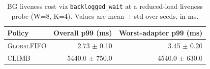 \begin{table}[t]
  \centering
  \small
  \setlength{\tabcolsep}{4pt}
  \caption{BG liveness cost via \texttt{backlogged\_wait} at a reduced-load liveness probe (W=8, K=4). Values are mean $\pm$ std over seeds, in ms.}
  \label{tab:bg_liveness}
  \begin{tabular}{lrr}
    \toprule
    Policy & Overall p99 (ms) & Worst-adapter p99 (ms) \\
    \midrule
    \textsc{GlobalFIFO} & 2.73 $\pm$ 0.10 & 3.45 $\pm$ 0.20 \\
    \textsc{CLIMB} & 5440.0 $\pm$ 750.0 & 4540.0 $\pm$ 630.0 \\
    \bottomrule
  \end{tabular}
\end{table}
